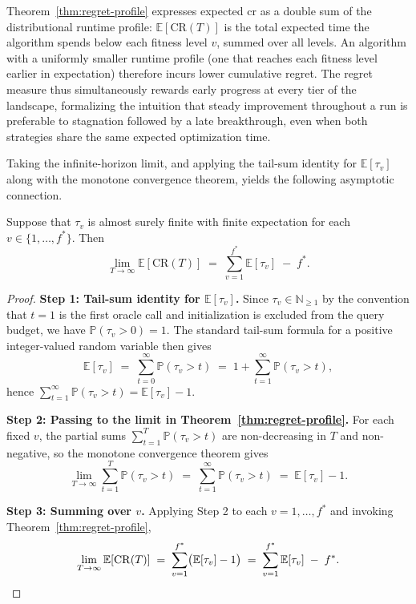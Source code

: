 Theorem~\ref{thm:regret-profile} expresses expected \acrshort{cr}
as a double sum
of the distributional runtime profile: $\mathbb{E}[\mathrm{CR}(T)]$ is the total
expected time the algorithm spends below each fitness level $v$,
summed over all levels.
An algorithm with a uniformly smaller runtime profile (one that
  reaches each fitness
level earlier in expectation) therefore incurs lower cumulative
regret. The regret
measure thus simultaneously rewards early progress at every tier of
the landscape,
formalizing the intuition that steady improvement throughout a run is
preferable to
stagnation followed by a late breakthrough, even when both strategies
share the same
expected optimization time.

Taking the infinite-horizon limit, and applying the tail-sum identity for
$\mathbb{E}[\tau_v]$ along with the monotone convergence theorem,
yields the following
asymptotic connection.

\begin{corollary}
  \label{cor:asymptotic-regret}
  Suppose that $\tau_v$ is almost surely finite with finite expectation for each
  $v \in \{1, \ldots, f^*\}$. Then
  \[
    \lim_{T \to \infty} \mathbb{E}[\mathrm{CR}(T)]
    \;=\;
    \sum_{v=1}^{f^*} \mathbb{E}[\tau_v] \;-\; f^*.
  \]
\end{corollary}

\begin{proof}
  \textbf{Step 1: Tail-sum identity for $\mathbb{E}[\tau_v]$.}
  Since $\tau_v \in \mathbb{N}_{\geq 1}$ by the convention that $t =
  1$ is the first
  oracle call and initialization is excluded from the query budget, we have
  $\mathbb{P}(\tau_v > 0) = 1$. The standard tail-sum formula for a positive
  integer-valued random variable then gives
  \[
    \mathbb{E}[\tau_v]
    \;=\; \sum_{t=0}^{\infty} \mathbb{P}(\tau_v > t)
    \;=\; 1 + \sum_{t=1}^{\infty} \mathbb{P}(\tau_v > t),
  \]
  hence $\sum_{t=1}^{\infty} \mathbb{P}(\tau_v > t) = \mathbb{E}[\tau_v] - 1$.

  \textbf{Step 2: Passing to the limit in Theorem~\ref{thm:regret-profile}.}
  For each fixed $v$, the partial sums
  $\sum_{t=1}^{T}\mathbb{P}(\tau_v > t)$ are
  non-decreasing in $T$ and non-negative, so the monotone convergence
  theorem gives
  \[
    \lim_{T\to\infty} \sum_{t=1}^{T} \mathbb{P}(\tau_v > t)
    \;=\; \sum_{t=1}^{\infty} \mathbb{P}(\tau_v > t)
    \;=\; \mathbb{E}[\tau_v] - 1.
  \]

  \textbf{Step 3: Summing over $v$.}
  Applying Step 2 to each $v = 1,\ldots, f^*$ and invoking
  Theorem~\ref{thm:regret-profile},
  \[
    \lim_{T \to \infty} \mathbb{E}[\mathrm{CR}(T)]
    \;=\; \sum_{v=1}^{f^*}\bigl(\mathbb{E}[\tau_v] - 1\bigr)
    \;=\; \sum_{v=1}^{f^*} \mathbb{E}[\tau_v] \;-\; f^*. \qedhere
  \]
\end{proof}

